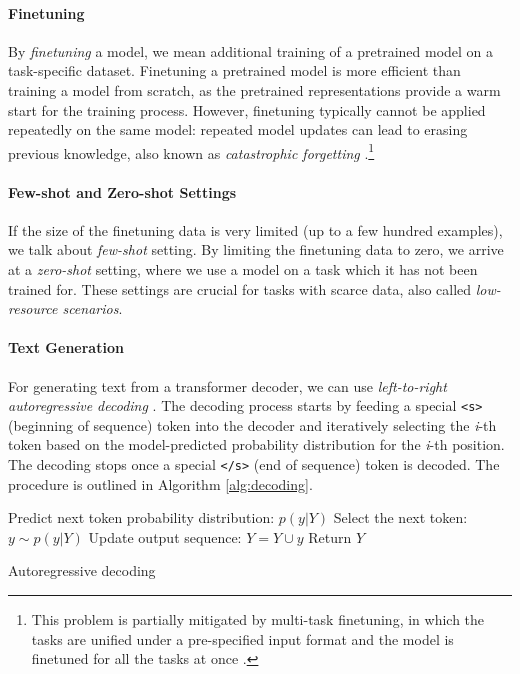 {\paragraph{Finetuning} By \emph{finetuning} a model, we mean additional training of a pretrained model on a task-specific dataset. Finetuning a pretrained model is more efficient than training a model from scratch, as the pretrained representations provide a warm start for the training process. However, finetuning typically cannot be applied repeatedly on the same model: repeated model updates can lead to erasing previous knowledge, also known as \emph{catastrophic forgetting} \cite{mccloskey1989catastrophic,kirkpatrick2017overcoming}.\footnote{This problem is partially mitigated by multi-task finetuning, in which the tasks are unified under a pre-specified input format and the model is finetuned for all the tasks at once \cite{sanh2021multitask,xieUnifiedSKGUnifyingMultiTasking2022}.}


\paragraph{Few-shot and Zero-shot Settings} If the size of the finetuning data is very limited (up to a few hundred examples), we talk about \emph{few-shot} setting. By limiting the finetuning data to zero, we arrive at a \emph{zero-shot} setting, where we use a model on a task which it has not been trained for. These settings are crucial for tasks with scarce data, also called \emph{low-resource scenarios}. \cite{hedderich2021survey}

\paragraph{Text Generation} For generating text from a transformer decoder, we can use \textit{left-to-right autoregressive decoding} \cite[p.196]{jurafsky2024}. The decoding process starts by feeding a special \texttt{<s>} (beginning of sequence) token into the decoder and iteratively selecting the \emph{i}-th token based on the model-predicted probability distribution for the \emph{i}-th position. The decoding stops once a special \texttt{</s>} (end of sequence) token is decoded. The procedure is outlined in Algorithm \ref{alg:decoding}.
\begin{algorithm}[ht]
    \begin{algorithmic}[1]
        \State Predict next token probability distribution: $p(y | Y)$
        \State Select the next token: $y \sim p(y | Y)$ \label{alg:dec:sample}
        \State Update output sequence: $Y = Y \cup y$
        \EndWhile
        \State Return $Y$
    \end{algorithmic}
    \caption{Autoregressive decoding}
    \label{alg:decoding}
\end{algorithm}

}
